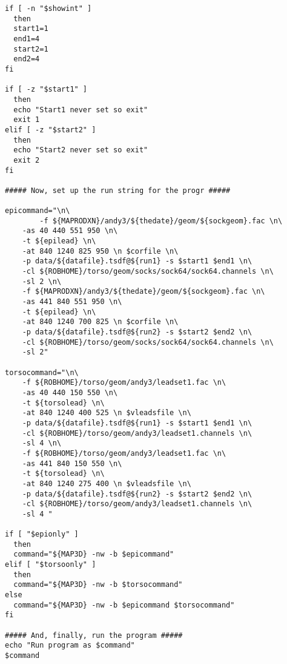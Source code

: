 \begin{verbatim}
if [ -n "$showint" ]
  then
  start1=1
  end1=4
  start2=1
  end2=4
fi

if [ -z "$start1" ]
  then
  echo "Start1 never set so exit"
  exit 1
elif [ -z "$start2" ]
  then
  echo "Start2 never set so exit"
  exit 2
fi

##### Now, set up the run string for the progr #####
  
epicommand="\n\
        -f ${MAPRODXN}/andy3/${thedate}/geom/${sockgeom}.fac \n\
	-as 40 440 551 950 \n\
	-t ${epilead} \n\
	-at 840 1240 825 950 \n $corfile \n\
	-p data/${datafile}.tsdf@${run1} -s $start1 $end1 \n\
	-cl ${ROBHOME}/torso/geom/socks/sock64/sock64.channels \n\
	-sl 2 \n\
	-f ${MAPRODXN}/andy3/${thedate}/geom/${sockgeom}.fac \n\
	-as 441 840 551 950 \n\
	-t ${epilead} \n\
	-at 840 1240 700 825 \n $corfile \n\
	-p data/${datafile}.tsdf@${run2} -s $start2 $end2 \n\
	-cl ${ROBHOME}/torso/geom/socks/sock64/sock64.channels \n\
	-sl 2"

torsocommand="\n\
	-f ${ROBHOME}/torso/geom/andy3/leadset1.fac \n\
	-as 40 440 150 550 \n\
	-t ${torsolead} \n\
	-at 840 1240 400 525 \n $vleadsfile \n\
	-p data/${datafile}.tsdf@${run1} -s $start1 $end1 \n\
	-cl ${ROBHOME}/torso/geom/andy3/leadset1.channels \n\
	-sl 4 \n\
	-f ${ROBHOME}/torso/geom/andy3/leadset1.fac \n\
	-as 441 840 150 550 \n\
	-t ${torsolead} \n\
	-at 840 1240 275 400 \n $vleadsfile \n\
	-p data/${datafile}.tsdf@${run2} -s $start2 $end2 \n\
	-cl ${ROBHOME}/torso/geom/andy3/leadset1.channels \n\
	-sl 4 "

if [ "$epionly" ]
  then
  command="${MAP3D} -nw -b $epicommand"
elif [ "$torsoonly" ]
  then
  command="${MAP3D} -nw -b $torsocommand"
else
  command="${MAP3D} -nw -b $epicommand $torsocommand"
fi

##### And, finally, run the program #####
echo "Run program as $command"
$command
\end{verbatim}


